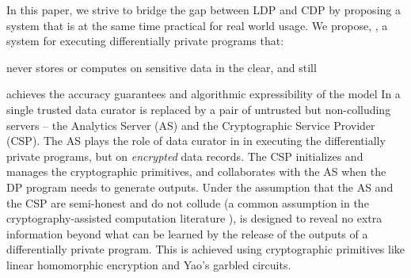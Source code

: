 In this paper, we strive to bridge the gap between LDP and CDP by proposing a system that is at the same time practical for real world usage. We propose, \system, a system for executing differentially private programs that: 
\squishlist
\item never stores or computes on sensitive data in the clear, and still
\item achieves the accuracy guarantees and algorithmic expressibility of the \cdp model \squishend 
In \system a single trusted data curator is replaced by a pair of untrusted but non-colluding servers -- the Analytics Server (\textsf{AS}) and the Cryptographic Service Provider (\textsf{CSP}). The \textsf{AS} plays the role of  data curator in \cdp in executing the differentially private programs, but on \textit{encrypted} data records. The \textsf{CSP} initializes and manages the cryptographic primitives, and collaborates with the \textsf{AS} when the DP program needs to generate outputs. Under the assumption that the \textsf{AS} and the \textsf{CSP} are semi-honest and do not collude (a common assumption in the cryptography-assisted computation literature \cite{Boneh1,Boneh2,Ridge2,Matrix2,secureML,LReg,Ver}), \system is designed to reveal no extra information beyond what can be learned by the release of the outputs of a differentially private program. This is achieved using cryptographic primitives like linear homomorphic encryption and Yao's garbled circuits. 

